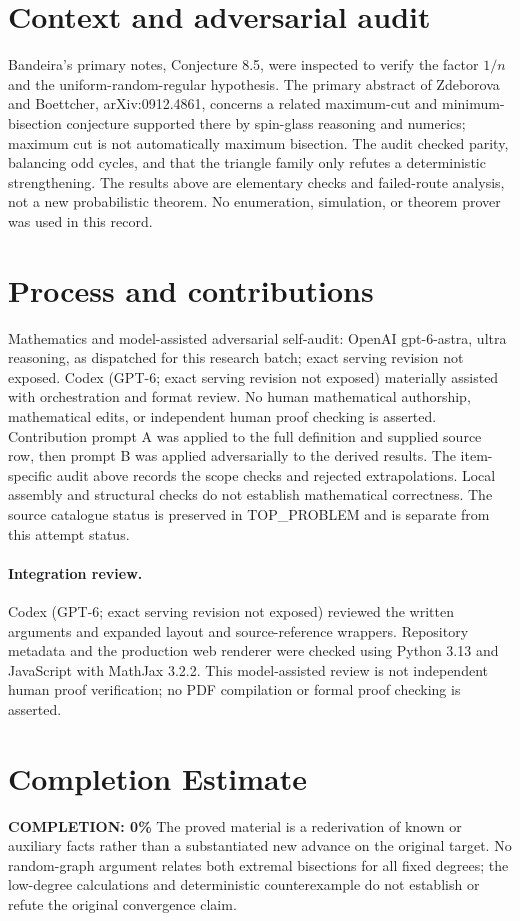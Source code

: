 \documentclass[11pt]{article}
\begin{document}
\section{Context and adversarial audit}
Bandeira's primary notes, Conjecture 8.5, were inspected to verify the factor
$1/n$ and the uniform-random-regular hypothesis. The primary abstract of
Zdeborova and Boettcher, arXiv:0912.4861, concerns a related maximum-cut and
minimum-bisection conjecture supported there by spin-glass reasoning and
numerics; maximum cut is not automatically maximum bisection.
The audit checked parity, balancing odd cycles, and that the triangle family
only refutes a deterministic strengthening. The results above are elementary
checks and failed-route analysis, not a new probabilistic theorem. No
enumeration, simulation, or theorem prover was used in this record.

\section{Process and contributions}
Mathematics and model-assisted adversarial self-audit: OpenAI gpt-6-astra, ultra reasoning, as dispatched for this research batch; exact serving revision not exposed. Codex (GPT-6; exact serving revision not exposed) materially assisted with orchestration and format review. No human mathematical authorship, mathematical edits, or independent human proof checking is asserted.
Contribution prompt A was applied to the full definition and supplied source row, then prompt B was applied adversarially to the derived results. The item-specific audit above records the scope checks and rejected extrapolations. Local assembly and structural checks do not establish mathematical correctness. The source catalogue status is preserved in TOP\_PROBLEM and is separate from this attempt status.
\paragraph{Integration review.} Codex (GPT-6; exact serving revision not exposed) reviewed the written arguments and expanded layout and source-reference wrappers. Repository metadata and the production web renderer were checked using Python 3.13 and JavaScript with MathJax 3.2.2. This model-assisted review is not independent human proof verification; no PDF compilation or formal proof checking is asserted.

\section{Completion Estimate}
\noindent\textbf{COMPLETION: 0\%}
The proved material is a rederivation of known or auxiliary facts rather than a substantiated new advance on the original target. No random-graph argument relates both extremal bisections for all fixed degrees; the low-degree calculations and deterministic counterexample do not establish or refute the original convergence claim.
\end{document}
